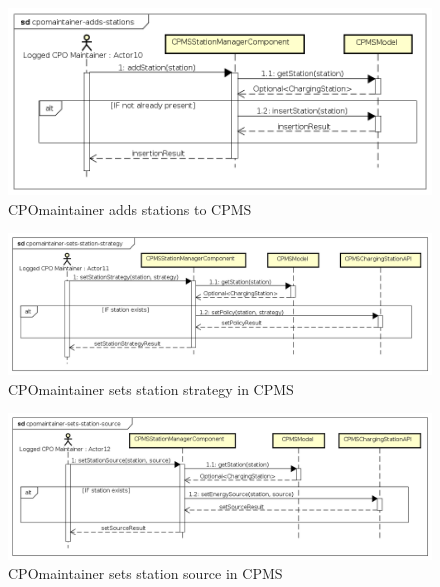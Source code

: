 \begin{figure}[!h]
    \begin{center}
        \includegraphics[keepaspectratio, width=16cm]{Sequence/cpomaintainer-adds-stations.png}
        \caption{\ac{CPO}maintainer adds stations to \ac{CPMS}}
        \label{fig:cpomaintainer-adds-stations}
    \end{center}
\end{figure}
\begin{figure}[!h]
    \begin{center}
        \includegraphics[keepaspectratio, width=16cm]{Sequence/cpomaintainer-sets-station-strategy.png}
        \caption{\ac{CPO}maintainer sets station strategy in \ac{CPMS}}
        \label{fig:cpomaintainer-sets-station-strategy}
    \end{center}
\end{figure}
\begin{figure}[!h]
    \begin{center}
        \includegraphics[keepaspectratio, width=16cm]{Sequence/cpomaintainer-sets-station-source.png}
        \caption{\ac{CPO}maintainer sets station source in \ac{CPMS}}
        \label{fig:cpomaintainer-sets-station-source}
    \end{center}
\end{figure}
